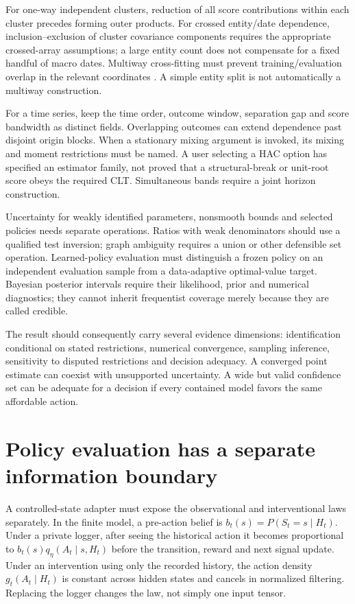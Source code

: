 For one-way independent clusters, reduction of all score contributions
within each cluster precedes forming outer products. For crossed
entity/date dependence, inclusion--exclusion of cluster covariance
components requires the appropriate crossed-array assumptions; a large
entity count does not compensate for a fixed handful of macro dates.
Multiway cross-fitting must prevent training/evaluation overlap in the
relevant coordinates \citep{cluster2021}. A simple entity split is not
automatically a multiway construction.

For a time series, keep the time order, outcome window, separation gap
and score bandwidth as distinct fields. Overlapping outcomes can extend
dependence past disjoint origin blocks. When a stationary mixing
argument is invoked, its mixing and moment restrictions must be named.
A user selecting a HAC option has specified an estimator family, not proved
that a structural-break or unit-root score obeys the required CLT.
Simultaneous bands require a joint horizon construction.

Uncertainty for weakly identified parameters, nonsmooth bounds and
selected policies needs separate operations. Ratios with weak
denominators should use a qualified test inversion; graph ambiguity
requires a union or other defensible set operation. Learned-policy
evaluation must distinguish a frozen policy on an independent evaluation
sample from a data-adaptive optimal-value target. Bayesian posterior
intervals require their likelihood, prior and numerical diagnostics;
they cannot inherit frequentist coverage merely because they are called
credible.

The result should consequently carry several evidence dimensions:
identification conditional on stated restrictions, numerical convergence,
sampling inference, sensitivity to disputed restrictions and decision
adequacy. A converged point estimate can coexist with unsupported
uncertainty. A wide but valid confidence set can be adequate for a decision
if every contained model favors the same affordable action.

\section{Policy evaluation has a separate information boundary}
\label{r3:planner-interface}

A controlled-state adapter must expose the observational and interventional
laws separately. In the finite model, a pre-action belief is
$b_t(s)=P(S_t=s\mid H_t)$. Under a private logger, after seeing the
historical action it becomes proportional to
$b_t(s)q_\eta(A_t\mid s,H_t)$ before the transition, reward and next
signal update. Under an intervention using only the recorded history,
the action density $g_t(A_t\mid H_t)$ is constant across hidden states
and cancels in normalized filtering. Replacing the logger changes the
law, not simply one input tensor.


